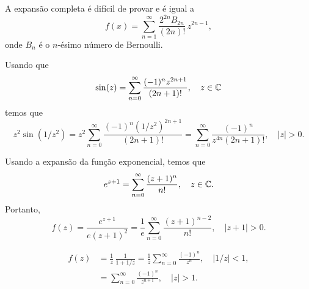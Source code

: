 \begin{questions}
\begin{solution}
    A expansão completa é difícil de provar e é igual a
    \[
        f(x) = \sum_{n=1}^\infty \frac{2^{2n} B_{2n}}{(2n)!}\,z^{2n-1},
    \]
    onde $B_n$ é o $n$-ésimo número de Bernoulli.
\end{solution}

\setcounter{question}{17}
%
\begin{solution}
    Usando que
    \[\sin(z) = \sum_{n=0}^{\infty}\frac{(-1)^n z^{2n+1}}{(2n+1)!}, \quad z\in{\mathbb C}\]
    temos que
    \[z^2\sin(1/z^2) = z^2 \sum_{n=0}^{\infty}\frac{(-1)^n (1/z^2)^{2n+1}}{(2n+1)!}
        = \sum_{n=0}^{\infty} \frac{(-1)^n}{z^{4n} (2n+1)!}, \quad |z|>0.\]
\end{solution}

%
\begin{solution}
Usando a expansão da função exponencial, temos que
    \[e^{z+1} = \sum_{n=0}^{\infty} \frac{(z+1)^n}{n!}, \quad z\in{\mathbb C}.\]
Portanto,
    \[f(z) = \frac{e^{z+1}}{e(z+1)^2} = \frac{1}{e} \sum_{n=0}^{\infty} \frac{(z+1)^{n-2}}{n!}, \quad |z+1| > 0.\]
\end{solution}

%
\begin{solution}
    \begin{align*}
        f(z) &= \frac{1}{z}\,\frac{1}{1+1/z}
                = \frac{1}{z} \sum_{n=0}^\infty \frac{(-1)^n}{z^n}, \quad |1/z|<1,\\
            &= \sum_{n=0}^\infty \frac{(-1)^n}{z^{n+1}}, \quad |z|>1.
    \end{align*}
\end{solution}


\end{questions}
